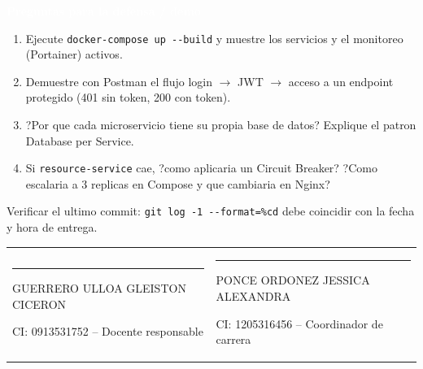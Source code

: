 \documentclass[10pt]{article}
\newcommand{\dimtitulo}[1]{%
\vspace{4pt}\begin{tcolorbox}[colback=azulMedio,colframe=azulMedio,boxrule=0pt,arc=1pt,left=6pt,right=6pt,top=3pt,bottom=3pt]
\textcolor{white}{\textbf{#1}}\end{tcolorbox}\vspace{-2pt}}
\begin{document}
\begin{minipage}[t]{0.31\textwidth}
\dimtitulo{Preguntas para la defensa / demo}
\footnotesize
\begin{enumerate}[leftmargin=1.3em,itemsep=2pt,topsep=2pt]
\item Ejecute \texttt{docker-compose up -{}-build} y muestre los servicios y el monitoreo (Portainer) activos.
\item Demuestre con Postman el flujo login $\to$ JWT $\to$ acceso a un endpoint protegido (401 sin token, 200 con token).
\item ?Por que cada microservicio tiene su propia base de datos? Explique el patron Database per Service.
\item Si \texttt{resource-service} cae, ?como aplicaria un Circuit Breaker? ?Como escalaria a 3 replicas en Compose y que cambiaria en Nginx?
\end{enumerate}
\vspace{2pt}
\begin{tcolorbox}[colback=verdeOk!6,colframe=verdeOk,boxrule=0.7pt,arc=1pt,left=5pt,right=5pt,top=3pt,bottom=3pt]
\footnotesize Verificar el ultimo commit: \texttt{git log -1 -{}-format=\%cd} debe coincidir con la fecha y hora de entrega.
\end{tcolorbox}
\end{minipage}

\vspace{10pt}
\noindent
\begin{tabularx}{\textwidth}{XX}
\centering \rule{6cm}{0.4pt}\par GUERRERO ULLOA GLEISTON CICERON\par CI: 0913531752 -- Docente responsable &
\centering \rule{6cm}{0.4pt}\par PONCE ORDONEZ JESSICA ALEXANDRA\par CI: 1205316456 -- Coordinador de carrera \tabularnewline
\end{tabularx}
\end{document}
